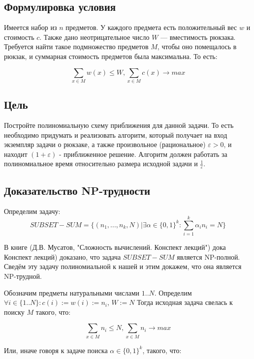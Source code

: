 \documentclass{article}
\begin{document}
	\subsection{Формулировка условия}


Имеется набор из $n$ предметов. У каждого предмета есть положительный вес $w$ и стоимость $c$. Также дано неотрицательное число $W$ — вместимость рюкзака.
Требуется найти такое подмножество предметов $M$, чтобы оно помещалось в рюкзак, и суммарная стоимость предметов была максимальна. То есть:

$$\sum\limits_{x \in M} {w(x)} \leq W, \sum\limits_{x \in M} {c(x)} \rightarrow max$$ 

	\subsection{Цель}

Постройте полиномиальную схему приближения для данной задачи. То есть необходимо придумать и реализовать алгоритм, который получает на вход экземпляр задачи о рюкзаке, а также произвольное (рациональное) $\varepsilon > 0$, и находит $(1 + \varepsilon)$ - приближенное решение. Алгоритм должен работать за полиномиальное время относительно размера исходной задачи и $\frac{1}{\varepsilon}$.

	\subsection{Доказательство NP-трудности}
 
Определим задачу: $$SUBSET-SUM = \{(n_1 , . . . , n_k , N ) | \exists \alpha \in \{0, 1\}^k : \sum\limits_{i = 1}^{k} {\alpha_i n_i} = N \}$$  

В книге (Д.В. Мусатов, "Сложность вычислений. Конспект лекций") дока
Конспект лекций) доказано, что задача $SUBSET-SUM$ является NP-полной. Сведём эту задачу полиномиальной к нашей и этим докажем, что она является NP-трудной. 
 
Обозначим предметы натуральными числами $1 .. N$. Определим $\forall i \in \{1..N\} : c(i) := w(i) := n_i$, $W := N$ Тогда исходная задача свелась к поиску $M$ такого, что:

$$\sum\limits_{x \in M} {n_i} \leq N, \sum\limits_{x \in M} {n_i} \rightarrow max$$ 
 
Или, иначе говоря к задаче поиска $\alpha \in \{0, 1\}^k$, такого, что:
\end{document}
